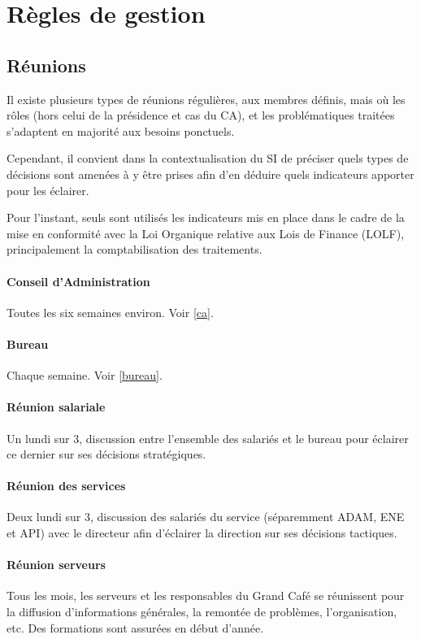 \section{Règles de gestion}
\label{gestion}

\subsection{Réunions}

Il existe plusieurs types de réunions régulières, aux membres définis,
mais où les rôles (hors celui de la présidence et cas du CA),
et les problématiques traitées s'adaptent en majorité aux besoins ponctuels.

Cependant, il convient dans la contextualisation du SI de préciser quels types
de décisions sont amenées à y être prises afin d'en déduire quels
indicateurs apporter pour les éclairer.

Pour l'instant, seuls sont utilisés les indicateurs mis en place dans le cadre
de la mise en conformité avec la Loi Organique relative aux Lois de Finance (LOLF),
principalement la comptabilisation des traitements.

\paragraph{Conseil d'Administration} Toutes les six semaines environ.
Voir \ref{ca}.

\paragraph{Bureau} Chaque semaine. Voir \ref{bureau}.

\paragraph{Réunion salariale} Un lundi sur 3, discussion entre l'ensemble
des salariés et le bureau pour éclairer ce dernier sur ses
décisions stratégiques.

\paragraph{Réunion des services} Deux lundi sur 3, discussion des
salariés du service (séparemment ADAM, ENE et API) avec le directeur
afin d'éclairer la direction sur ses décisions tactiques.

\paragraph{Réunion serveurs} Tous les mois, les serveurs et les responsables
du Grand Café se réunissent pour la diffusion d'informations générales,
la remontée de problèmes, l'organisation, etc. Des formations sont
assurées en début d'année.

